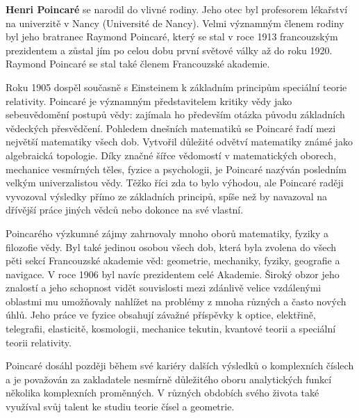       \begin{tcnote}
        \textbf{Henri Poincaré} se narodil do vlivné rodiny. Jeho otec byl profesorem lékařství na
        univerzitě v Nancy (Université de Nancy). Velmi významným členem rodiny byl jeho bratranec
        Raymond Poincaré, který se stal v roce 1913 francouzským prezidentem a zůstal jím po celou
        dobu první světové války až do roku 1920. Raymond Poincaré se stal také členem Francouzské
        akademie.
        
        Roku 1905 dospěl současně s Einsteinem k základním principům speciální teorie relativity.
        Poincaré je významným představitelem kritiky vědy jako sebeuvědomění postupů vědy: zajímala
        ho především otázka původu základních vědeckých přesvědčení. Pohledem dnešních matematiků se
        Poincaré řadí mezi největší matematiky všech dob. Vytvořil důležité odvětví matematiky známé
        jako algebraická topologie. Díky značné šířce vědomostí v matematických oborech, mechanice
        vesmírných těles, fyzice a psychologii, je Poincaré nazýván posledním velkým univerzalistou
        vědy. Těžko říci zda to bylo výhodou, ale Poincaré raději vyvozoval výsledky přímo ze
        základních principů, spíše než by navazoval na dřívější práce jiných vědců nebo dokonce na
        své vlastní.

        {\centering
          \captionsetup{type=figure} 
          \label{fyz:fig0946}
        \par}

        Poincarého výzkumné zájmy zahrnovaly mnoho oborů matematiky, fyziky a filozofie vědy. Byl
        také jedinou osobou všech dob, která byla zvolena do všech pěti sekcí Francouzské akademie
        věd: geometrie, mechaniky, fyziky, geografie a navigace. V roce 1906 byl navíc prezidentem
        celé Akademie. Široký obzor jeho znalostí a jeho schopnost vidět souvislosti mezi zdánlivě
        velice vzdálenými oblastmi mu umožňovaly nahlížet na problémy z mnoha různých a často nových
        úhlů. Jeho práce ve fyzice obsahují závažné příspěvky k optice, elektřině, telegrafii,
        elasticitě, kosmologii, mechanice tekutin, kvantové teorii a speciální teorii relativity.

        Poincaré dosáhl později během své kariéry dalších výsledků o komplexních číslech a je
        považován za zakladatele nesmírně důležitého oboru analytických funkcí několika komplexních
        proměnných. V různých obdobích svého života také využíval svůj talent ke studiu teorie čísel
        a geometrie.


\end{tcnote}
